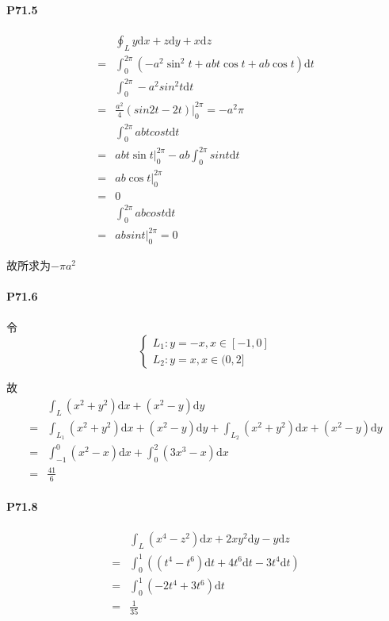\documentclass[UTF8]{ctexart}
\begin{document}
\paragraph*{P71.5}
\begin{align*}
    &\oint_{L} y \mathrm{d}x + z \mathrm{d}y + x \mathrm{d}z \\
    =& \int_{0}^{2\pi} (-a^2\sin^2t + abt\cos t + ab\cos t) \mathrm{d}t \\
    & \int_{0}^{2\pi} -a^2sin^2t \mathrm{d}t \\
    =& \frac{a^2}{4} (sin2t - 2t)\big|_{0}^{2\pi} = -a^2\pi  \\
    & \int_{0}^{2\pi} abtcost  \mathrm{d}t \\
    =& abt\sin t \big|_{0}^{2\pi}  - ab \int_{0}^{2\pi} sint \mathrm{d}t \\
    =& ab\cos t \big|_{0}^{2\pi} \\
    =& 0 \\
     & \int_{0}^{2\pi}abcost \mathrm{d}t \\
    =& absint \big|_{0}^{2\pi} = 0
\end{align*}

故所求为$-\pi a^2$
\paragraph*{P71.6}
令
\begin{equation*}
    \begin{cases}
        L_1: y=-x ,x \in [-1, 0] \\
        L_2: y=x, x \in (0, 2]
    \end{cases}
\end{equation*}

故
\begin{align*}
  &\int_{L}^{} (x^2+y^2) \mathrm{d}x + (x^2 - y) \mathrm{d}y \\
  =& \int_{L_1}^{} (x^2+y^2) \mathrm{d}x + (x^2 - y) \mathrm{d}y + 
  \int_{L_2}^{} (x^2+y^2) \mathrm{d}x + (x^2 - y) \mathrm{d}y \\
  =& \int_{-1}^{0} (x^2-x) \mathrm{d}x + \int_{0}^{2} (3x^3 - x)\mathrm{d}x \\
  =& \frac{41}{6} 
\end{align*}
\paragraph*{P71.8}
\begin{align*}
    &\int_{L}^{} (x^4-z^2)\mathrm{d}x+2xy^2 \mathrm{d}y - y \mathrm{d}z \\
    =& \int_{0}^{1} ((t^4-t^6)\mathrm{d}t + 4t^6 \mathrm{d}t - 3t^4 \mathrm{d}t) \\
    =& \int_{0}^{1} (-2t^4+3t^6) \mathrm{d}t \\
    =& \frac{1}{35} 
\end{align*}
\end{document}
